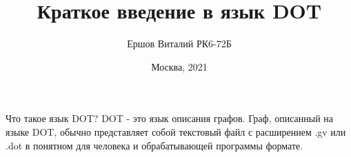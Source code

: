 \documentclass{beamer}
\begin{document}
\title{Краткое введение в язык DOT}
\author{Ершов Виталий РК6-72Б}
\date{Москва, 2021} 
\frame{\titlepage}

\begin{frame}{Что такое язык DOT?}
	DOT - это язык описания графов.
	\newline
	\newline
	Граф, описанный на языке DOT, обычно представляет собой текстовый файл с расширением .gv или .dot в понятном для человека и обрабатывающей программы формате.
	\begin{figure}[h]
	\begin{minipage}[h]{0.49\linewidth}
	\end{minipage}
	\hfill
	\begin{minipage}[h]{0.49\linewidth}
	\end{minipage}
	\label{ris:image1}
	\end{figure}
\end{frame}
\end{document}
